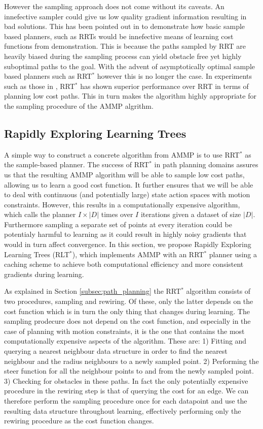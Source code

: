 \documentclass{article}  %
\begin{document}
	However the sampling approach does not come without its caveats. An innefective sampler could give us low quality gradient information resulting in bad solutions. This has been pointed out in \cite{ratliff2009chomp} to demonstrate how basic sample based planners, such as RRTs would be innefective means of learning cost functions from demonstration. This is because the paths sampled by RRT are heavily biased during the sampling process can yield obstacle free yet highly suboptimal paths to the goal. With the advent of asymptotically optimal sample based planners such as RRT$^*$ however this is no longer the case. In experiments such as those in \cite{karaman2011sampling}, RRT$^*$ has shown superior performance over RRT in terms of planning low cost paths. This in turn makes the algorithm highly appropriate for the sampling procedure of the AMMP algrithm.  

\subsection{Rapidly Exploring Learning Trees \label{subsec:cached}}

A simple way to construct a concrete algorithm from AMMP is to use RRT$^*$ as the sample-based planner. The success of RRT$^*$ in path planning domains assures us that the resulting AMMP algorithm will be able to sample low cost paths, allowing us to learn a good cost function. It further ensures that we will be able to deal with continuous (and potentially large) state action spaces with motion constraints. However, this results in a computationally expensive algorithm, which calls the planner $I\times|D|$ times over $I$ iterations given a dataset of size $|D|$. Furthermore sampling a separate set of points at every iteration could be potentialy harmful to learning as it could result in highly noisy gradients that would in turn affect convergence. In this section, we propose Rapidly Exploring Learning Trees (RLT$^*$), which implements AMMP with an RRT$^*$ planner using a caching scheme to achieve both computational efficiency and more consistent gradients during learning.

As explained in Section \ref{subsec:path_planning} the RRT$^*$ algorithm consists of two procedures, sampling and rewiring. Of these, only the latter depends on the cost function which is in turn the only thing that changes during learning. The sampling prodecure does not depend on the cost function, and especially in the case of planning with motion constraints, it is the one that contains the most computationally expensive aspects of the algorithm. These are: 1) Fitting and querying a nearest neighbour data structure in order to find the nearest neighbour and the radius neighbours to a newly sampled point. 2) Performing the steer function for all the neighbour points to and from the newly sampled point. 3) Checking for obstacles in these paths. In fact the only potentially expensive procedure in the rewiring step is that of querying the cost for an edge. We can therefore perform the sampling procedure once for each datapoint and use the resulting data structure throughout learning, effectively performing only the rewiring procedure as the cost function changes.
\end{document}
